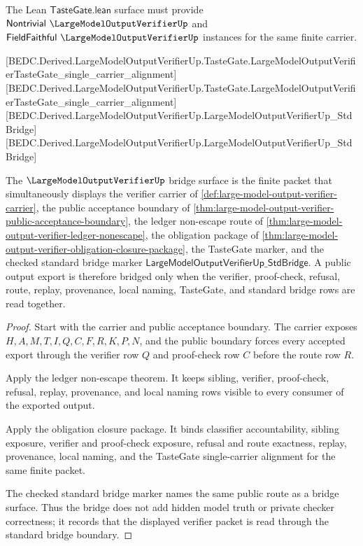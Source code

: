 The Lean $\mathsf{TasteGate.lean}$ surface must provide $\mathsf{Nontrivial}\ \LargeModelOutputVerifierUp$ and $\mathsf{FieldFaithful}\ \LargeModelOutputVerifierUp$ instances for the same finite carrier.

[BEDC.Derived.LargeModelOutputVerifierUp.TasteGate.LargeModelOutputVerifierTasteGate\_single\_carrier\_alignment]
[BEDC.Derived.LargeModelOutputVerifierUp.TasteGate.LargeModelOutputVerifierTasteGate\_single\_carrier\_alignment]
[BEDC.Derived.LargeModelOutputVerifierUp.LargeModelOutputVerifierUp\_StdBridge]
[BEDC.Derived.LargeModelOutputVerifierUp.LargeModelOutputVerifierUp\_StdBridge]

\begin{theorem}
\label{thm:large-model-output-verifier-bridge-surface}
The $\LargeModelOutputVerifierUp$ bridge surface is the finite packet that simultaneously displays the verifier carrier of \autoref{def:large-model-output-verifier-carrier}, the public acceptance boundary of \autoref{thm:large-model-output-verifier-public-acceptance-boundary}, the ledger non-escape route of \autoref{thm:large-model-output-verifier-ledger-nonescape}, the obligation package of \autoref{thm:large-model-output-verifier-obligation-closure-package}, the TasteGate marker, and the checked standard bridge marker $\mathsf{LargeModelOutputVerifierUp\_StdBridge}$. A public output export is therefore bridged only when the verifier, proof-check, refusal, route, replay, provenance, local naming, TasteGate, and standard bridge rows are read together.
\end{theorem}
\begin{proof}
Start with the carrier and public acceptance boundary. The carrier exposes $H,A,M,T,I,Q,C,F,R,K,P,N$, and the public boundary forces every accepted export through the verifier row $Q$ and proof-check row $C$ before the route row $R$.

Apply the ledger non-escape theorem. It keeps sibling, verifier, proof-check, refusal, replay, provenance, and local naming rows visible to every consumer of the exported output.

Apply the obligation closure package. It binds classifier accountability, sibling exposure, verifier and proof-check exposure, refusal and route exactness, replay, provenance, local naming, and the TasteGate single-carrier alignment for the same finite packet.

The checked standard bridge marker names the same public route as a bridge surface. Thus the bridge does not add hidden model truth or private checker correctness; it records that the displayed verifier packet is read through the standard bridge boundary.
\end{proof}

